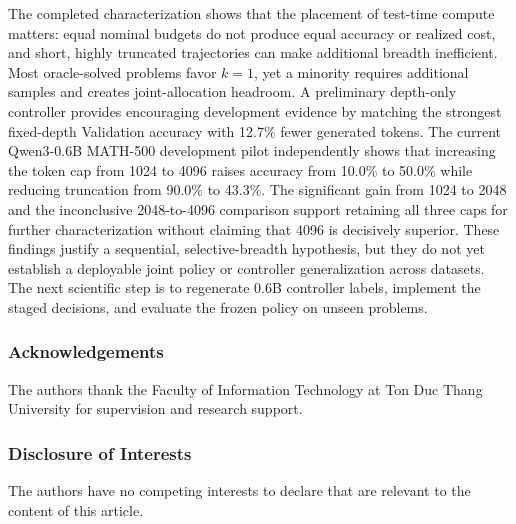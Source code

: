 \documentclass[runningheads]{llncs}
\begin{document}
The completed characterization shows that the placement of test-time compute
matters: equal nominal budgets do not produce equal accuracy or realized cost,
and short, highly truncated trajectories can make additional breadth
inefficient. Most oracle-solved problems favor $k=1$, yet a minority requires
additional samples and creates joint-allocation headroom. A preliminary
depth-only controller provides encouraging development evidence by matching
the strongest fixed-depth Validation accuracy with 12.7\% fewer generated
tokens. The current Qwen3-0.6B MATH-500 development pilot independently shows
that increasing the token cap from 1024 to 4096 raises accuracy from 10.0\% to
50.0\% while reducing truncation from 90.0\% to 43.3\%. The significant gain
from 1024 to 2048 and the inconclusive 2048-to-4096 comparison support retaining
all three caps for further characterization without claiming that 4096 is
decisively superior. These findings justify a sequential, selective-breadth
hypothesis, but they do not yet establish a deployable joint policy or
controller generalization across datasets. The next scientific step is to
regenerate 0.6B controller labels, implement the staged decisions, and evaluate
the frozen policy on unseen problems.

\begin{credits}
\subsubsection{Acknowledgements}
The authors thank the Faculty of Information Technology at Ton Duc Thang
University for supervision and research support.

\subsubsection{Disclosure of Interests}
The authors have no competing interests to declare that are relevant to the
content of this article.
\end{credits}
\end{document}
